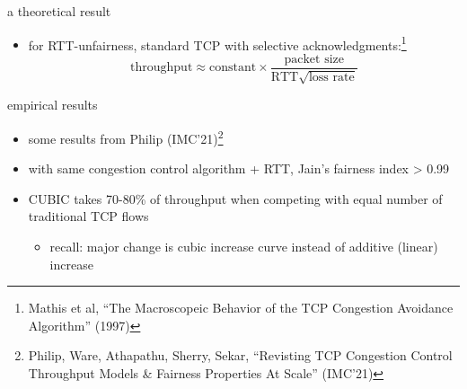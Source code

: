 \begin{frame}{a theoretical result}
    \begin{itemize}
    \item for RTT-unfairness, standard TCP with selective acknowledgments:\footnote{Mathis et al, ``The Macroscopeic Behavior of the TCP Congestion Avoidance Algorithm'' (1997)}
    \[\text{throughput} \approx \text{constant} \times \frac{\text{packet size}}{\text{RTT}\sqrt{\text{loss rate}}}\]
    \end{itemize}
\end{frame}

\begin{frame}{empirical results}
    \begin{itemize}
    \item some results from Philip (IMC'21)\footnote{Philip, Ware, Athapathu, Sherry, Sekar, ``Revisting TCP Congestion Control Throughput Models \& Fairness Properties At Scale'' (IMC'21)}
    \item with same congestion control algorithm + RTT, Jain's fairness index > 0.99
    \item CUBIC takes 70-80\% of throughput when competing with equal number of traditional TCP flows
        \begin{itemize}
        \item recall: major change is cubic increase curve instead of additive (linear) increase
        \end{itemize}
    \end{itemize}
\end{frame}
